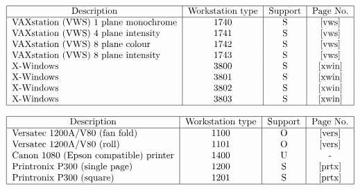 \begin{table}\caption{Workstations}
\[\begin{tabular}{|l|c|c|c|}\hline
\multicolumn{1}{|c|}{Description} &Workstation type &Support &Page No.\\\hline
VAXstation (VWS) 1 plane monochrome   &1740 &S &\pageref{vws}\\
VAXstation (VWS) 4 plane intensity    &1741 &S &\pageref{vws}\\
VAXstation (VWS) 8 plane colour       &1742 &S &\pageref{vws}\\
VAXstation (VWS) 8 plane intensity    &1743 &S &\pageref{vws}\\
X-Windows                             &3800 &S &\pageref{xwin}\\
X-Windows                             &3801 &S &\pageref{xwin}\\
X-Windows                             &3802 &S &\pageref{xwin}\\
X-Windows                             &3803 &S &\pageref{xwin}\\
\hline\end{tabular}\]\end{table}

\begin{table}\caption{Dot Matrix Printers}
\[\begin{tabular}{|l|c|c|c|}\hline
\multicolumn{1}{|c|}{Description} &Workstation type &Support &Page No.\\\hline
Versatec 1200A/V80 (fan fold)         &1100 &O &\pageref{vers}\\
Versatec 1200A/V80 (roll)             &1101 &O &\pageref{vers}\\
Canon 1080 (Epson compatible) printer &1400 &U &-\\
Printronix P300 (single page)         &1200 &S &\pageref{prtx}\\
Printronix P300 (square)              &1201 &S &\pageref{prtx}\\
\hline\end{tabular}\]\end{table}

